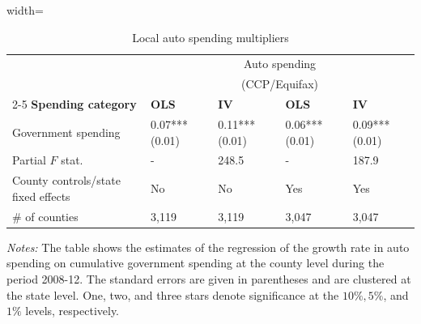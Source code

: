 \documentclass[\latexroot/\projectname]{subfiles}
\begin{document}
\begin{table}[h]
  \centering
  \caption{Local auto spending multipliers\whenintegrated{\label{tab:empirics-auto-multipliers}}}
  \begin{adjustbox}{width=\textwidth}
  \begin{tabular}{lllll}
    \hline
     & \multicolumn{4}{c}{Auto spending} \\
     & \multicolumn{4}{c}{(CCP/Equifax)} \\
    \cline{2-5}
    \textbf{Spending category} & \textbf{OLS} & \textbf{IV} & \textbf{OLS} & \textbf{IV} \\
    \hline
    Government spending & 0.07*** (0.01) & 0.11*** (0.01) & 0.06*** (0.01) & 0.09*** (0.01) \\
    Partial $F$ stat. & - & 248.5 & - & 187.9 \\
    County controls/state fixed effects & No & No & Yes & Yes \\
    \# of counties & 3,119 & 3,119 & 3,047 & 3,047 \\
  \end{tabular}
  \end{adjustbox}
  \begin{flushleft}
    \footnotesize
    \textit{Notes:} The table shows the estimates of the regression of the growth rate in auto spending on cumulative government spending at the county level during the period 2008-12. The standard errors are given in parentheses and are clustered at the state level. One, two, and three stars denote significance at the $10 \%, 5 \%$, and $1 \%$ levels, respectively.
  \end{flushleft}
\end{table}

\smartbib
\end{document}
